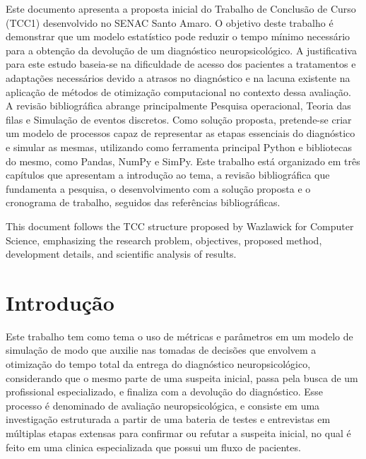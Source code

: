 \documentclass[
    12pt,
    openright,
    oneside,
    a4paper,
    english,
    brazil
]{abntex2}
\begin{document}
\frenchspacing

\pretextual

\imprimircapa
\imprimirfolhaderosto

\begin{resumo}
Este documento apresenta a proposta inicial do Trabalho de Conclusão de Curso (TCC1) desenvolvido no SENAC Santo Amaro. O objetivo deste trabalho é demonstrar que um modelo estatístico pode reduzir o tempo mínimo necessário para a obtenção da devolução de um diagnóstico neuropsicológico. A justificativa para este estudo baseia-se na dificuldade de acesso dos pacientes a tratamentos e adaptações necessários devido a atrasos no diagnóstico e na lacuna existente na aplicação de métodos de otimização computacional no contexto dessa avaliação. A revisão bibliográfica abrange principalmente Pesquisa operacional, Teoria das filas e Simulação de eventos discretos. Como solução proposta, pretende-se criar um modelo de processos capaz de representar as etapas essenciais do diagnóstico e simular as mesmas, utilizando como ferramenta principal Python e bibliotecas do mesmo, como Pandas, NumPy e SimPy. Este trabalho está organizado em três capítulos que apresentam a introdução ao tema, a revisão bibliográfica que fundamenta a pesquisa, o desenvolvimento com a solução proposta e o cronograma de trabalho, seguidos das referências bibliográficas.
\end{resumo}

\begin{resumo}[Abstract]
This document follows the TCC structure proposed by Wazlawick for Computer Science, emphasizing the research problem, objectives, proposed method, development details, and scientific analysis of results.
\end{resumo}

\tableofcontents*
\cleardoublepage

\textual

\chapter{Introdução}

Este trabalho tem como tema o uso de métricas e parâmetros em um modelo de simulação de modo que auxilie nas tomadas de decisões que envolvem a otimização do tempo total da entrega do diagnóstico neuropsicológico, considerando que o mesmo parte de uma suspeita inicial, passa pela busca de um profissional especializado, e finaliza com a devolução do diagnóstico. Esse processo é denominado de avaliação neuropsicológica, e consiste em uma investigação estruturada a partir de uma bateria de testes e entrevistas em múltiplas etapas extensas para confirmar ou refutar a suspeita inicial, no qual é feito em uma clinica especializada que possui um fluxo de pacientes.
\end{document}
